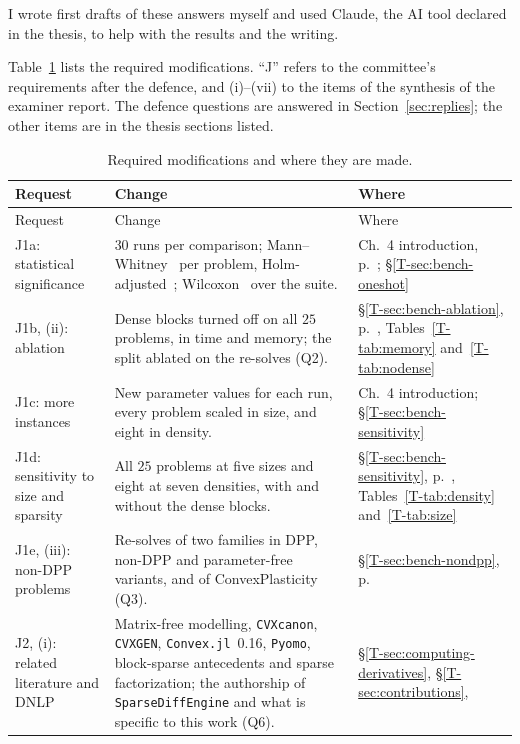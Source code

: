 \documentclass[letterpaper,12pt]{article}
\newcommand{\tsec}[1]{\S\ref{T-#1}}
\newcommand{\tpage}[1]{p.~\pageref{T-#1}}
\newcommand{\tref}[1]{\tsec{#1}, \tpage{#1}}
\begin{document}
I wrote first drafts of these answers myself and used Claude, the AI tool declared in the
thesis, to help with the results and the writing.

Table~\ref{tab:required} lists the required modifications. ``J'' refers to the committee's
requirements after the defence, and (i)--(vii) to the items of the synthesis of the examiner
report. The defence questions are answered in Section~\ref{sec:replies}; the other items are
in the thesis sections listed.

{\small
\begin{longtable}{>{\raggedright}p{} >{\raggedright}p{}
  >{\raggedright\arraybackslash}p{}}
\caption{Required modifications and where they are made.}\label{tab:required}\\
\toprule
Request & Change & Where \\
\midrule
\endfirsthead
\toprule
Request & Change & Where \\
\midrule
\endhead
\bottomrule
\endfoot
J1a: statistical significance
  & $30$ runs per comparison; Mann--Whitney~\cite{mann1947} per problem,
    Holm-adjusted~\cite{holm1979}; Wilcoxon~\cite{wilcoxon1945} over the suite.
  & Ch.~4 introduction, \tpage{sec:Theme2}; \tsec{sec:bench-oneshot} \\
J1b, (ii): ablation
  & Dense blocks turned off on all $25$ problems, in time and memory; the split ablated on the
    re-solves (Q2).
  & \tref{sec:bench-ablation}, Tables~\ref{T-tab:memory} and~\ref{T-tab:nodense} \\
J1c: more instances
  & New parameter values for each run, every problem scaled in size, and eight in density.
  & Ch.~4 introduction; \tsec{sec:bench-sensitivity} \\
J1d: sensitivity to size and sparsity
  & All $25$ problems at five sizes and eight at seven densities, with and without the dense
    blocks.
  & \tref{sec:bench-sensitivity}, Tables~\ref{T-tab:density} and~\ref{T-tab:size} \\
J1e, (iii): non-DPP problems
  & Re-solves of two families in DPP, non-DPP and parameter-free variants, and of
    ConvexPlasticity (Q3).
  & \tref{sec:bench-nondpp} \\
J2, (i): related literature and DNLP
  & Matrix-free modelling, \texttt{CVXcanon}, \texttt{CVXGEN}, \texttt{Convex.jl}~0.16,
    \texttt{Pyomo}, block-sparse antecedents and sparse factorization; the authorship
    of \texttt{SparseDiffEngine} and what is specific to this work (Q6).
  & \S\ref{T-sec:computing-derivatives}, \tsec{sec:contributions},

\end{longtable}}
\end{document}
